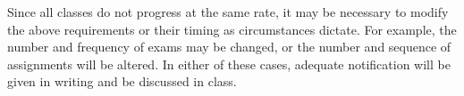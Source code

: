         Since all classes do not progress at the same rate, it may be necessary to modify the above requirements or their timing as circumstances dictate. For example, the number and frequency of exams may be changed, or the number and sequence of assignments will be altered. In either of these cases, adequate notification will be given in writing and be discussed in class.
